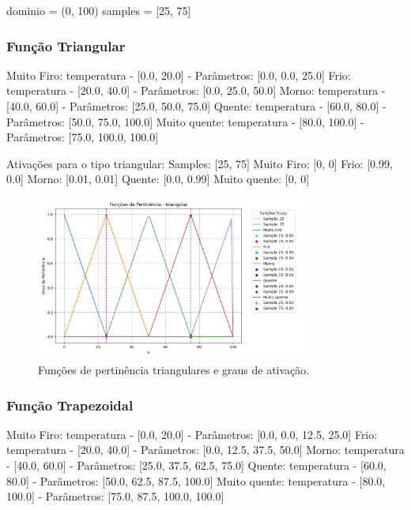 \documentclass[a4paper,12pt]{article}
\begin{document}
dominio = (0, 100) 
samples = [25, 75]


\subsubsection{Função Triangular}
Muito Firo: temperatura - [0.0, 20.0] - Parâmetros: [0.0, 0.0, 25.0]
Frio: temperatura - [20.0, 40.0] - Parâmetros: [0.0, 25.0, 50.0]
Morno: temperatura - [40.0, 60.0] - Parâmetros: [25.0, 50.0, 75.0]
Quente: temperatura - [60.0, 80.0] - Parâmetros: [50.0, 75.0, 100.0]
Muito quente: temperatura - [80.0, 100.0] - Parâmetros: [75.0, 100.0, 100.0]

Ativações para o tipo triangular:
Samples: [25, 75]
Muito Firo: [0, 0]
Frio: [0.99, 0.0]
Morno: [0.01, 0.01]
Quente: [0.0, 0.99]
Muito quente: [0, 0]


\begin{figure}[H]
    \centering
    \includegraphics[width=0.8\textwidth]{img/funções_de_pertinência_triangular_fuzzificado.png}
    \caption{Funções de pertinência triangulares e graus de ativação.}
\end{figure}

\subsubsection{Função Trapezoidal}

Muito Firo: temperatura - [0.0, 20.0] - Parâmetros: [0.0, 0.0, 12.5, 25.0]
Frio: temperatura - [20.0, 40.0] - Parâmetros: [0.0, 12.5, 37.5, 50.0]
Morno: temperatura - [40.0, 60.0] - Parâmetros: [25.0, 37.5, 62.5, 75.0]
Quente: temperatura - [60.0, 80.0] - Parâmetros: [50.0, 62.5, 87.5, 100.0]
Muito quente: temperatura - [80.0, 100.0] - Parâmetros: [75.0, 87.5, 100.0, 100.0]
\end{document}
